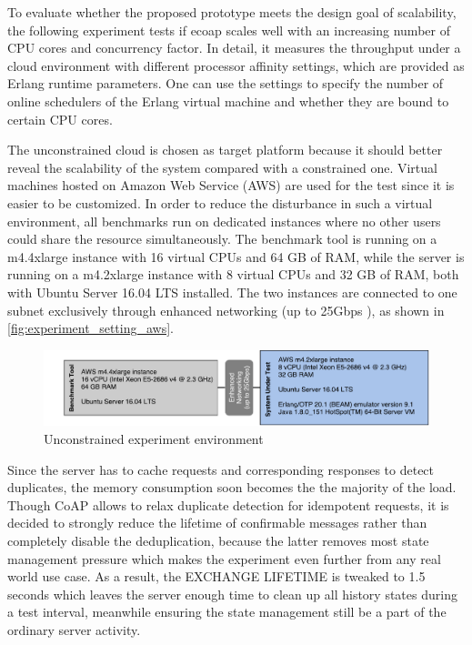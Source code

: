 To evaluate whether the proposed prototype meets the design goal of scalability, the following experiment tests if ecoap scales well with an increasing number of CPU cores and concurrency factor. In detail, it measures the throughput under a cloud environment with different processor affinity settings, which are provided as Erlang runtime parameters. One can use the settings to specify the number of online schedulers of the Erlang virtual machine and whether they are bound to certain CPU cores.

The unconstrained cloud is chosen as target platform because it should better reveal the scalability of the system compared with a constrained one. Virtual machines hosted on Amazon Web Service (AWS) are used for the test since it is easier to be customized. In order to reduce the disturbance in such a virtual environment, all benchmarks run on dedicated instances \cite{aws_dedicated_instance} where no other users could share the resource simultaneously. The benchmark tool is running on a m4.4xlarge instance with 16 virtual CPUs and 64 GB of RAM, while the server is running on a m4.2xlarge instance with 8 virtual CPUs and 32 GB of RAM, both with Ubuntu Server 16.04 LTS installed. The two instances are connected to one subnet exclusively through enhanced networking (up to 25Gbps \cite{aws_instance}), as shown in \autoref{fig:experiment_setting_aws}. 

\begin{figure}[!htbp]
\centering
\includegraphics[scale = 0.55]{experiment_setting_aws}
\caption{Unconstrained experiment environment}
\label{fig:experiment_setting_aws}
\end{figure}

Since the server has to cache requests and corresponding responses to detect duplicates, the memory consumption soon becomes the the majority of the load. Though CoAP allows to relax duplicate detection for idempotent requests, it is decided to strongly reduce the lifetime of confirmable messages rather than completely disable the deduplication, because the latter removes most state management pressure which makes the experiment even further from any real world use case. As a result, the EXCHANGE LIFETIME is tweaked to 1.5 seconds which leaves the server enough time to clean up all history states during a test interval, meanwhile ensuring the state management still be a part of the ordinary server activity.

